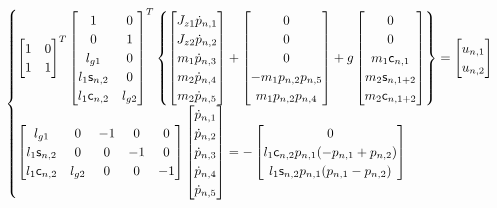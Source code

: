 \begin{itemize}
\begin{equation}
\begin{cases}
\begin{bmatrix}
1 & 0 \\
1 & 1 \\
\end{bmatrix}^T
\begin{bmatrix}
 1 & 0 \\
 0 & 1 \\
 l_{g1} & 0 \\
 l_1 \mathsf{s}_{n,2} & 0 \\
 l_1 \mathsf{c}_{n,2} & l_{g2} \\
\end{bmatrix}^T
\begin{Bmatrix}
	\begin{bmatrix}
	J_{z1} \dot{p}_{n,1} \\
	J_{z2} \dot{p}_{n,2} \\
	m_1 \dot{p}_{n,3} \\
	m_2 \dot{p}_{n,4} \\
	m_2 \dot{p}_{n,5} \\
	\end{bmatrix}
	+
	\begin{bmatrix}
	0 \\
	0 \\
	0 \\
	- m_1 p_{n,2} p_{n,5} \\
	  m_1 p_{n,2} p_{n,4} \\
	\end{bmatrix}
	+
	g \begin{bmatrix}
	0 \\
	0 \\
	m_1 \mathsf{c}_{n,1} \\
	m_2 \mathsf{s}_{n,1+2} \\
	m_2 \mathsf{c}_{n,1+2} \\
	\end{bmatrix}
\end{Bmatrix}
=
\begin{bmatrix}
u_{n,1} \\
u_{n,2}
\end{bmatrix} \\

\begin{bmatrix}
l_{g1} & 0 & -1 & 0 & 0 \\
l_1 \mathsf{s}_{n,2} & 0 & 0 & -1 & 0 \\
l_1 \mathsf{c}_{n,2} & l_{g2}  & 0 & 0 & -1 \\
\end{bmatrix}
\begin{bmatrix}
\dot{p}_{n,1} \\
\dot{p}_{n,2} \\
\dot{p}_{n,3} \\
\dot{p}_{n,4} \\
\dot{p}_{n,5} \\
\end{bmatrix}
=
-
\begin{bmatrix}
0 \\
l_1 \mathsf{c}_{n,2} p_{n,1} (-p_{n,1}+p_{n,2}) \\
l_1 \mathsf{s}_{n,2} p_{n,1} (p_{n,1}-p_{n,2}) \\
\end{bmatrix}


\end{cases}
\end{equation}
\end{itemize}

